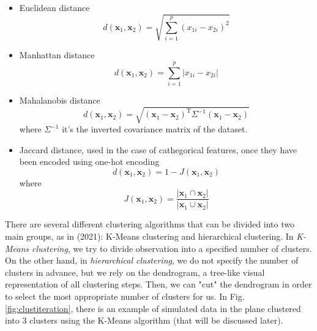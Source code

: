 \begin{itemize}
    \item Euclidean distance
\begin{equation}
    \label{eq:euclidean}
    d\left(\mathbf{x}_1,\mathbf{x}_2\right) = \sqrt{\sum_{i=1}^p\left(x_{1i}-x_{2i} \right)^2}
\end{equation}
\item Manhattan distance
\begin{equation}
    \label{eq:mandistance}
    d\left(\mathbf{x}_1,\mathbf{x}_2\right) = \sum_{i=1}^p\left|x_{1i}-x_{2i} \right|
\end{equation}
\item Mahalanobis distance
\begin{equation}
    \label{eq:mahadistance}
    d(\mathbf{x}_1, \mathbf{x}_2) = \sqrt{(\mathbf{x}_1 - \mathbf{x}_2)^\mathrm{T} \Sigma^{-1} (\mathbf{x}_1 - \mathbf{x}_2)}
\end{equation}
where $\Sigma^{-1}$ it's the inverted covariance matrix of the dataset.
\item Jaccard distance, used in the case of cathegorical features, once they have been encoded using one-hot encoding
\begin{equation}
    \label{eq:jaccard}
    d\left(\mathbf{x}_1, \mathbf{x}_2\right) = 1 - J\left(\mathbf{x}_1, \mathbf{x}_2\right)
\end{equation}
where 
\begin{equation}
J\left(\mathbf{x}_1, \mathbf{x}_2\right) = \frac{\left|\mathbf{x}_1 \cap \mathbf{x}_2\right|}{\left|\mathbf{x}_1 \cup \mathbf{x}_2\right|}    
\end{equation}
\end{itemize}
There are several different clustering algorithms that can be divided into two main groups, as in \citeauthor{james_introduction_2021} (2021): K-Means clustering and hierarchical clustering. In \emph{K-Means clustering}, we try to divide observation into a specified number of clusters. On the other hand, in \emph{hierarchical clustering}, we do not specify the number of clusters in advance, but we rely on the dendrogram, a tree-like visual representation of all clustering steps. Then, we can "cut" the dendrogram in order to select the most appropriate number of clusters for us. In Fig. \ref{fig:clustiteration}, there is an example of simulated data in the plane clustered into 3 clusters using the K-Means algorithm (that will be discussed later).


